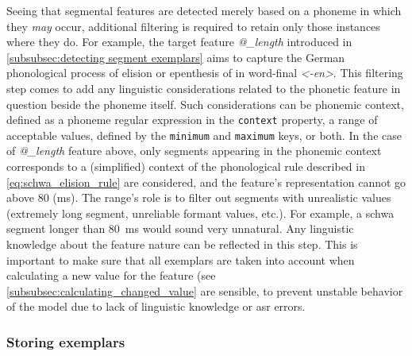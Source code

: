 Seeing that segmental features are detected merely based on a phoneme in which they \emph{may} occur, additional filtering is required to retain only those instances where they do.
For example, the target feature \textit{@\_length} introduced in \cref{subsubsec:detecting segment exemplars} aims to capture the German phonological process of elision or epenthesis of  in word-final \textit{<-en>}.
%
%
%
This filtering step comes to add any linguistic considerations related to the phonetic feature in question beside the phoneme itself.
Such considerations can be phonemic context, defined as a phoneme regular expression in the \texttt{context} property, a range of acceptable values, defined by the \texttt{minimum} and \texttt{maximum} keys, or both.
In the case of \textit{@\_length} feature above, only segments appearing in the phonemic context corresponds to a (simplified) context of the phonological rule described in \cref{eq:schwa_elision_rule} are considered, and the feature's representation cannot go above 80 (\si{\milli\second}).
The range's role is to filter out segments with unrealistic values (extremely long segment, unreliable formant values, etc.).
For example, a schwa segment longer than \SI{80}{\milli\second} would sound very unnatural.
Any linguistic knowledge about the feature nature can be reflected in this step.
This is important to make sure that all exemplars are taken into account when calculating a new value for the feature (see \cref{subsubsec:calculating_changed_value} are sensible, to prevent unstable behavior of the model due to lack of linguistic knowledge or \ac{asr} errors.

\subsubsection{Storing exemplars}
\label{subsubsec:collecting_exemplars}

